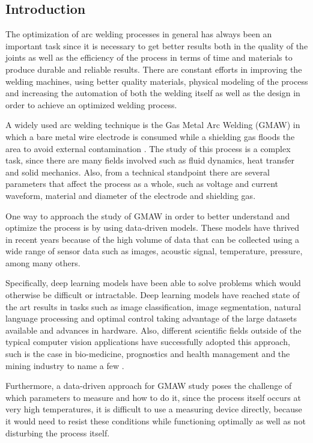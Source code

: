 \begin{intro}
\section{Introduction}
The optimization of arc welding processes in general has always been an important task since it is necessary to get better results both in the quality of the joints as well as the efficiency of the process in terms of time and materials to produce durable and reliable results. There are constant efforts in improving the welding machines, using better quality materials, physical modeling of the process and increasing the automation of both the welding itself as well as the design in order to achieve an optimized welding process.

A widely used arc welding technique is the Gas Metal Arc Welding (GMAW) in which a bare metal wire electrode is consumed while a shielding gas floods the area to avoid external contamination \cite{weld-review}. The study of this process is a complex task, since there are many fields involved such as fluid dynamics, heat transfer and solid mechanics. Also, from a technical standpoint there are several parameters that affect the process as a whole, such as voltage and current waveform, material and diameter of the electrode and shielding gas.

One way to approach the study of GMAW in order to better understand and optimize the process is by using data-driven models. These models have thrived in recent years because of the high volume of data that can be collected using a wide range of sensor data such as images, acoustic signal, temperature, pressure, among many others. 

Specifically, deep learning models have been able to solve problems which would otherwise be difficult or intractable. Deep learning models have reached state of the art results in tasks such as image classification, image segmentation, natural language processing and optimal control taking advantage of the large datasets available \cite{dl-review} and advances in hardware. Also, different scientific fields outside of the typical computer vision applications have successfully adopted this approach, such is the case in bio-medicine, prognostics and health management and the mining industry to name a few \cite{Ronneberger, Reza, Jia}.

Furthermore, a data-driven approach for GMAW study poses the challenge of which parameters to measure and how to do it, since the process itself occurs at very high temperatures, it is difficult to use a measuring device directly, because it would need to resist these conditions while functioning optimally as well as not disturbing the process itself.


\end{intro}

